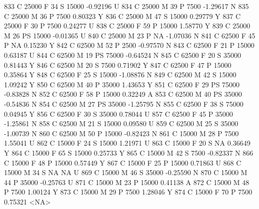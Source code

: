 \documentclass{article}
\begin{document}
\begin{Schunk}
\begin{Soutput}
833       C      25000   F  34         S  15000  -0.92196    U
834       C      25000   M  39         P   7500  -1.29617    N
835       C      25000   M  36         P   7500   0.80323    Y
836       C      25000   M  47         S  15000   0.29779    Y
837       C      25000   F  30         P   7500   0.24277    U
838       C      25000   F  59         P  15000   1.58770    Y
839       C      25000   M  26        PS  15000  -0.01365    U
840       C      25000   M  23         P     NA  -1.07036    N
841       C      62500   F  45         P     NA   0.15230    Y
842       C      62500   M  52         P   2500  -0.97570    N
843       C      62500   F  21         P  15000   0.63187    U
844       C      62500   M  19        PS  75000  -0.64524    N
845       C      62500   F  20         S  35000   0.81443    Y
846       C      62500   M  20         S   7500   0.71902    Y
847       C      62500   F  47         P  15000   0.35864    Y
848       C      62500   F  25         S  15000  -1.08876    N
849       C      62500   M  42         S  15000   1.09242    Y
850       C      62500   M  40         P  35000   1.43653    Y
851       C      62500   F  29        PS  75000  -0.83828    N
852       C      62500   F  58         P  15000   0.32249    A
853       C      62500   M  40        PS  35000  -0.54836    N
854       C      62500   M  27        PS  35000  -1.25795    N
855       C      62500   F  38         S  75000   0.04945    Y
856       C      62500   F  30         S  35000   0.78044    U
857       C      62500   F  45         P  35000  -1.25861    N
858       C      62500   M  21         S  15000   0.09580    U
859       C      62500   M  25         S  35000  -1.00739    N
860       C      62500   M  50         P  15000  -0.82423    N
861       C      15000   M  28         P   7500   1.55041    U
862       C      15000   F  24         S  15000   1.21971    U
863       C      15000   F  20         S     NA   0.36649    Y
864       C      15000   F  65         S  15000   0.25733    Y
865       C      15000   M  42         S   7500  -0.82337    N
866       C      15000   F  48         P  15000   0.57449    Y
867       C      15000   F  25         P  15000   0.71863    U
868       C      15000   M  34         S     NA        NA    U
869       C      15000   M  46         S  35000  -0.25590    N
870       C      15000   M  44         P  35000  -0.25763    U
871       C      15000   M  23         P  15000   0.41138    A
872       C      15000   M  48         P   7500   1.00124    Y
873       C      15000   M  29         P   7500   1.28046    Y
874       C      15000   F  70         P   7500   0.75321 <NA>

\end{Soutput}
\end{Schunk}
\end{document}
